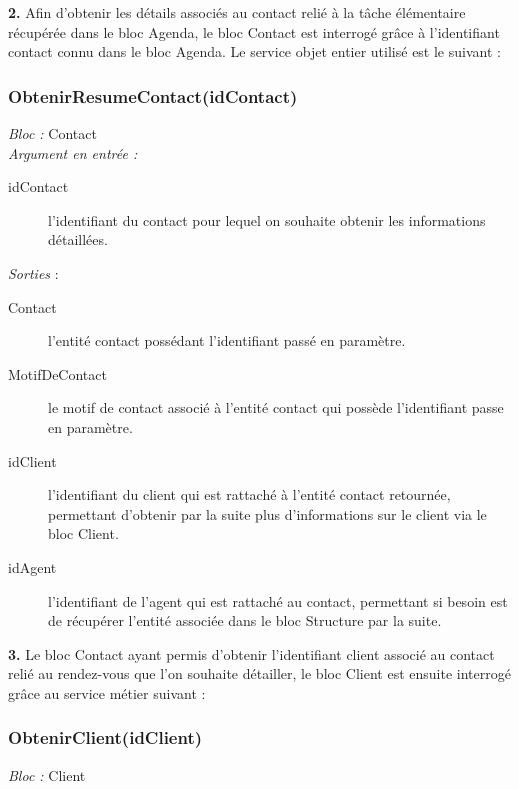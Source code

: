 \begin{shaded}
\textbf{2.} Afin d'obtenir les détails associés au contact relié à la tâche élémentaire récupérée dans le bloc Agenda, le bloc Contact est interrogé grâce à l'identifiant contact connu dans le bloc Agenda. Le service objet entier utilisé est le suivant :
\end{shaded}

\subsubsection{ObtenirResumeContact(idContact)}
\noindent \textit{Bloc : } Contact \\

\noindent \textit{Argument en entrée :}
\begin{description}
\item[idContact] l'identifiant du contact pour lequel on souhaite obtenir les informations détaillées. \\
\end{description}

\noindent \textit{Sorties} :
\begin{description}
\item[Contact] l'entité contact possédant l'identifiant passé en paramètre. 
\item[MotifDeContact] le motif de contact associé à l'entité contact qui possède l'identifiant passe en paramètre.  
\item[idClient] l'identifiant du client qui est rattaché à l'entité contact retournée, permettant d'obtenir par la suite plus d'informations sur le client via le bloc Client. 
\item[idAgent] l'identifiant de l'agent qui est rattaché au contact, permettant si besoin est de récupérer l'entité associée dans le bloc Structure par la suite. \\
\end{description}

\begin{shaded}
\textbf{3.} Le bloc Contact ayant permis d'obtenir l'identifiant client associé au contact relié au rendez-vous que l'on souhaite détailler, le bloc Client est ensuite interrogé grâce au service métier suivant :
\end{shaded}

\subsubsection{ObtenirClient(idClient)}
\noindent \textit{Bloc : } Client \\

